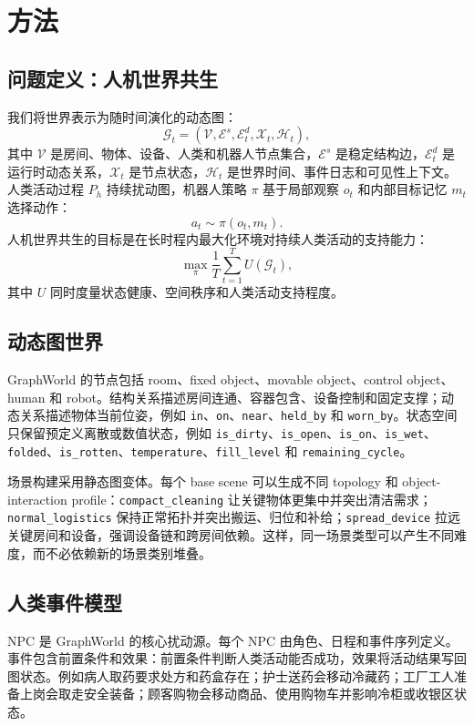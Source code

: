 \documentclass[journal]{IEEEtran}
\begin{document}
\section{方法}
\subsection{问题定义：人机世界共生}
我们将世界表示为随时间演化的动态图：
\begin{equation}
\mathcal{G}_t = (\mathcal{V}, \mathcal{E}^s, \mathcal{E}^d_t, \mathcal{X}_t, \mathcal{H}_t),
\end{equation}
其中 $\mathcal{V}$ 是房间、物体、设备、人类和机器人节点集合，$\mathcal{E}^s$ 是稳定结构边，$\mathcal{E}^d_t$ 是运行时动态关系，$\mathcal{X}_t$ 是节点状态，$\mathcal{H}_t$ 是世界时间、事件日志和可见性上下文。人类活动过程 $P_h$ 持续扰动图，机器人策略 $\pi$ 基于局部观察 $o_t$ 和内部目标记忆 $m_t$ 选择动作：
\begin{equation}
a_t \sim \pi(o_t, m_t).
\end{equation}
人机世界共生的目标是在长时程内最大化环境对持续人类活动的支持能力：
\begin{equation}
\max_{\pi} \frac{1}{T}\sum_{t=1}^{T} U(\mathcal{G}_t),
\end{equation}
其中 $U$ 同时度量状态健康、空间秩序和人类活动支持程度。

\subsection{动态图世界}
GraphWorld 的节点包括 room、fixed object、movable object、control object、human 和 robot。结构关系描述房间连通、容器包含、设备控制和固定支撑；动态关系描述物体当前位姿，例如 \texttt{in}、\texttt{on}、\texttt{near}、\texttt{held\_by} 和 \texttt{worn\_by}。状态空间只保留预定义离散或数值状态，例如 \texttt{is\_dirty}、\texttt{is\_open}、\texttt{is\_on}、\texttt{is\_wet}、\texttt{folded}、\texttt{is\_rotten}、\texttt{temperature}、\texttt{fill\_level} 和 \texttt{remaining\_cycle}。

场景构建采用静态图变体。每个 base scene 可以生成不同 topology 和 object-interaction profile：\texttt{compact\_cleaning} 让关键物体更集中并突出清洁需求；\texttt{normal\_logistics} 保持正常拓扑并突出搬运、归位和补给；\texttt{spread\_device} 拉远关键房间和设备，强调设备链和跨房间依赖。这样，同一场景类型可以产生不同难度，而不必依赖新的场景类别堆叠。

\subsection{人类事件模型}
NPC 是 GraphWorld 的核心扰动源。每个 NPC 由角色、日程和事件序列定义。事件包含前置条件和效果：前置条件判断人类活动能否成功，效果将活动结果写回图状态。例如病人取药要求处方和药盒存在；护士送药会移动冷藏药；工厂工人准备上岗会取走安全装备；顾客购物会移动商品、使用购物车并影响冷柜或收银区状态。
\end{document}
